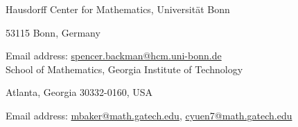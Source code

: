 \documentclass[12pt]{amsart}
\numberwithin{equation}{section}
\theoremstyle{definition}
\begin{document}
\newpage





\medskip

Hausdorff Center for Mathematics, Universit{\"a}t Bonn

53115 Bonn, Germany

Email address: \url{spencer.backman@hcm.uni-bonn.de}\\

School of Mathematics, Georgia Institute of Technology

Atlanta, Georgia 30332-0160, USA

Email address: \url{mbaker@math.gatech.edu}, \url{cyuen7@math.gatech.edu}
\end{document}
